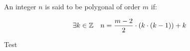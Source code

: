 %

\begin{definition}
    \label{def:Polygonal}
    \leanok
    An integer $n$ is said to be polygonal of order $m$ if:

    \[
        \exists k \in \mathbb{Z} \quad n = \frac{m-2}{2}\cdot (k \cdot (k-1)) + k
    \]
\end{definition}

\begin{theorem}
    \label{thm:mod_m_congr}
    \leanok
    Test
    
\end{theorem}





